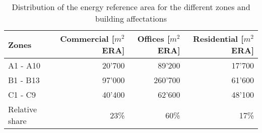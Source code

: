 \begin{table}[h!]
\centering
\caption{Distribution of the energy reference area for the different zones and building affectations}\vspace{2mm}
\label{tab:henchoz_area} 
\begin{tabular}{lrrr}
	\toprule
	Zones          & Commercial [$m^{2}$ ERA] & Offices  [$m^{2}$ ERA] & Residential  [$m^{2}$ ERA] \\ \midrule
	A1 - A10       & 20'700                   & 89'200                 & 17'700                     \\
	B1 - B13       & 97'000                   & 260'700                & 61'600                     \\
	C1 - C9        & 40'400                   & 62'600                 & 48'100                     \\ \midrule
	Relative share & 23\%                     & 60\%                   & 17\%                       \\ \bottomrule
\end{tabular}
\end{table}